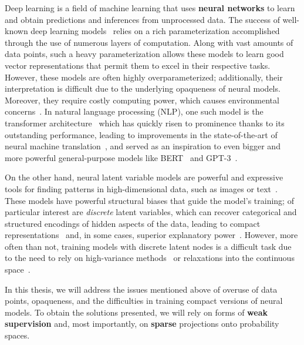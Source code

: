 \label{cap:int}

\cleardoublepage
\doublespacing

\noindent Deep learning is a field of machine learning that uses
\textbf{neural networks} to learn and obtain predictions
and inferences from unprocessed data. The success of well-known deep
learning models~\citep[\textit{inter
        alia}]{convnet,devlin2018bert,brown2020language} relies on a rich
parameterization accomplished through the use of numerous layers of
computation. Along with vast amounts of data points,
such a heavy parameterization allows these models to learn good
vector representations that permit them to excel in their respective
tasks. However, these models are often highly overparameterized;
additionally, their interpretation is difficult due to the underlying
opaqueness of neural models. Moreover, they require costly computing
power, which causes environmental concerns~\citep{Strubell2019}. In
natural language processing (NLP), one such model is the transformer
architecture~\citep{vaswani2017attention} which has quickly risen to
prominence thanks to its outstanding performance, leading to
improvements in the state-of-the-art of neural machine
translation~\citep[NMT;][]{marian,ott2018scaling}, and served as an
inspiration to even bigger and more powerful general-purpose models
like BERT~\citep{devlin2018bert} and
\mbox{GPT-3}~\citep{brown2020language}.

On the other hand, neural latent variable models are powerful and
expressive tools for finding patterns in high-dimensional data, such
as images or text~\citep{Kim2018,Kingma+2014:VAE,RezendeEtAl14VAE}.
These models have powerful structural biases that guide the model's
training; of particular
interest are \emph{discrete} latent variables, which can recover
categorical and structured encodings of hidden aspects of the data,
leading to compact representations~\citep{KingmaEtAl2014SSVAE} and,
in some cases, superior explanatory power~\citep{titov2008joint,
    Bastings2019}. However, more often than not, training models with
discrete latent nodes is a difficult task due to the need to rely on
high-variance methods~\citep{Williams1992} or relaxations into the
continuous space~\citep{GumbelSoftmax,Concrete}.

In this thesis, we will address the issues mentioned above of overuse
of data points, opaqueness, and the difficulties in training compact
versions of neural models. To obtain the solutions presented, we will
rely on forms of \textbf{weak supervision} and, most importantly, on
\textbf{sparse} projections onto probability spaces.

